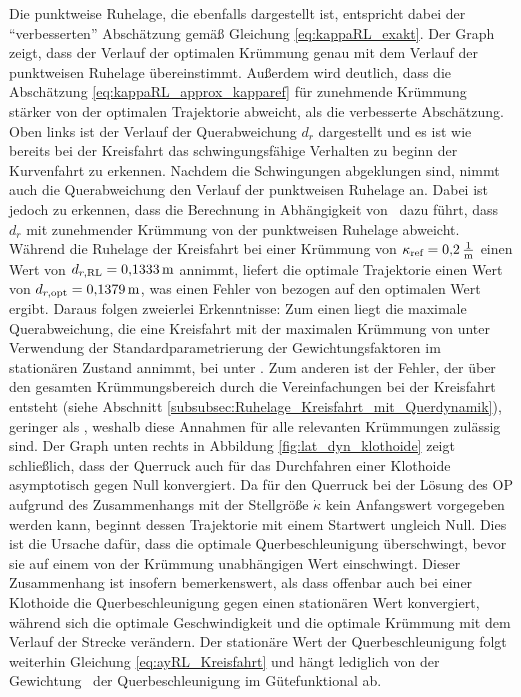 Die punktweise Ruhelage, die ebenfalls dargestellt ist, entspricht dabei der ``verbesserten'' Abschätzung gemäß Gleichung \eqref{eq:kappaRL_exakt}. Der Graph zeigt, dass der Verlauf der optimalen Krümmung genau mit dem Verlauf der punktweisen Ruhelage übereinstimmt. Außerdem wird deutlich, dass die Abschätzung \eqref{eq:kappaRL_approx_kapparef} für zunehmende Krümmung stärker von der optimalen Trajektorie abweicht, als die verbesserte Abschätzung. Oben links ist der Verlauf der Querabweichung $d_r$ dargestellt und es ist wie bereits bei der Kreisfahrt das schwingungsfähige Verhalten zu beginn der Kurvenfahrt zu erkennen. Nachdem die Schwingungen abgeklungen sind, nimmt auch die Querabweichung den Verlauf der punktweisen Ruhelage an. Dabei ist jedoch zu erkennen, dass die Berechnung in Abhängigkeit von \kapparefofs~dazu führt, dass $d_r$ mit zunehmender Krümmung von der punktweisen Ruhelage abweicht. Während die Ruhelage der Kreisfahrt bei einer Krümmung von $\kappa_{\textrm{ref}} = 0{,}2\,\mathrm{\frac{\mathrm{1}}{\mathrm{m}}}$ einen Wert von $d_{r,\textrm{RL}} = 0{,}1333\,\mathrm{m}$ annimmt, liefert die optimale Trajektorie einen Wert von $d_{r,\textrm{opt}} = 0{,}1379\,\mathrm{m}$, was einen Fehler von  bezogen auf den optimalen Wert ergibt. Daraus folgen zweierlei Erkenntnisse: Zum einen liegt die maximale Querabweichung, die eine Kreisfahrt mit der maximalen Krümmung von  unter Verwendung der Standardparametrierung der Gewichtungsfaktoren im stationären Zustand annimmt, bei unter . Zum anderen ist der Fehler, der über den gesamten Krümmungsbereich durch die Vereinfachungen bei der Kreisfahrt entsteht (siehe Abschnitt \ref{subsubsec:Ruhelage_Kreisfahrt_mit_Querdynamik}), geringer als , weshalb diese Annahmen für alle relevanten Krümmungen zulässig sind. Der Graph unten rechts in Abbildung \ref{fig:lat_dyn_klothoide} zeigt schließlich, dass der Querruck auch für das Durchfahren einer Klothoide asymptotisch gegen Null konvergiert. Da für den Querruck bei der Lösung des \gls{OP} aufgrund des Zusammenhangs mit der Stellgröße $\dot{\kappa}$ kein Anfangswert vorgegeben werden kann, beginnt dessen Trajektorie mit einem Startwert ungleich Null. Dies ist die Ursache dafür, dass die optimale Querbeschleunigung überschwingt, bevor sie auf einem von der Krümmung unabhängigen Wert einschwingt. Dieser Zusammenhang ist insofern bemerkenswert, als dass offenbar auch bei einer Klothoide die Querbeschleunigung gegen einen stationären Wert konvergiert, während sich die optimale Geschwindigkeit und die optimale Krümmung mit dem Verlauf der Strecke verändern. Der stationäre Wert der Querbeschleunigung folgt weiterhin Gleichung \eqref{eq:ayRL_Kreisfahrt} und hängt lediglich von der Gewichtung \fay~der Querbeschleunigung im Gütefunktional ab.

